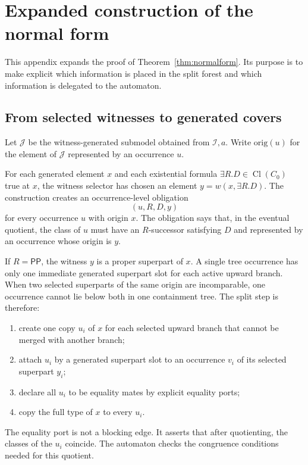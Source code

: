 \documentclass[11pt]{article}
\newcommand{\PP}{\mathsf{PP}}
\newcommand{\Cl}{\operatorname{Cl}}
\begin{document}
\section{Expanded construction of the normal form}

This appendix expands the proof of Theorem~\ref{thm:normalform}.  Its purpose is to make explicit which information is placed in the split forest and which information is delegated to the automaton.

\subsection{From selected witnesses to generated covers}

Let $\mathcal J$ be the witness-generated submodel obtained from $\mathcal I,a$.  Write $\mathrm{orig}(u)$ for the element of $\mathcal J$ represented by an occurrence $u$.

For each generated element $x$ and each existential formula $\exists R.D\in\Cl(C_0)$ true at $x$, the witness selector has chosen an element $y=w(x,\exists R.D)$.  The construction creates an occurrence-level obligation
\[
  (u,R,D,y)
\]
for every occurrence $u$ with origin $x$.  The obligation says that, in the eventual quotient, the class of $u$ must have an $R$-successor satisfying $D$ and represented by an occurrence whose origin is $y$.

If $R=\PP$, the witness $y$ is a proper superpart of $x$.  A single tree occurrence has only one immediate generated superpart slot for each active upward branch.  When two selected superparts of the same origin are incomparable, one occurrence cannot lie below both in one containment tree.  The split step is therefore:
\begin{enumerate}[label=(U\arabic*)]
\item create one copy $u_i$ of $x$ for each selected upward branch that cannot be merged with another branch;
\item attach $u_i$ by a generated superpart slot to an occurrence $v_i$ of its selected superpart $y_i$;
\item declare all $u_i$ to be equality mates by explicit equality ports;
\item copy the full type of $x$ to every $u_i$.
\end{enumerate}
The equality port is not a blocking edge.  It asserts that after quotienting, the classes of the $u_i$ coincide.  The automaton checks the congruence conditions needed for this quotient.
\end{document}
